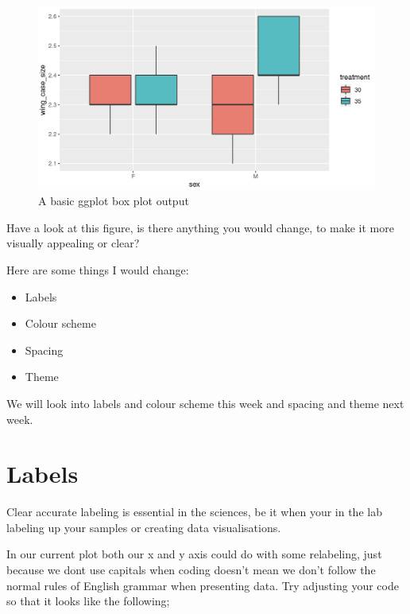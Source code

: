 \documentclass[
]{book}
\providecommand{\tightlist}{%
  \setlength{\itemsep}{0pt}\setlength{\parskip}{0pt}}
\begin{document}
\begin{figure}
\includegraphics[width=0.9\linewidth]{figures/screenshot_deconstructingaplot_2} \caption{A basic ggplot box plot output}\label{fig:unnamed-chunk-52}
\end{figure}

Have a look at this figure, is there anything you would change, to make it more visually appealing or clear?

Here are some things I would change:

\begin{itemize}
\tightlist
\item
  Labels
\item
  Colour scheme
\item
  Spacing
\item
  Theme
\end{itemize}

We will look into labels and colour scheme this week and spacing and theme next week.

\section{Labels}\label{labels}

Clear accurate labeling is essential in the sciences, be it when your in the lab labeling up your samples or creating data visualisations.

In our current plot both our x and y axis could do with some relabeling, just because we dont use capitals when coding doesn't mean we don't follow the normal rules of English grammar when presenting data. Try adjusting your code so that it looks like the following;
\end{document}
